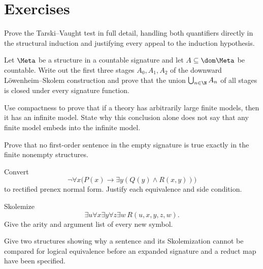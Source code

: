 \section{Exercises}
\label{sec:fol-cardinality-normalforms-06}

\begin{exercise}
\label{ex:fol-cardinality-normalforms-01}
Prove the Tarski--Vaught test in full detail, handling both quantifiers
directly in the structural induction and justifying every appeal to the
induction hypothesis.
\end{exercise}

\begin{exercise}
\label{ex:fol-cardinality-normalforms-02}
Let \(\Meta\) be a structure in a countable signature and let
\(A\subseteq\dom\Meta\) be countable.  Write out the first three stages
\(A_0,A_1,A_2\) of the downward L\"owenheim--Skolem construction and prove
that the union \(\bigcup_{n\in\N}A_n\) of all stages is closed under every
signature function.
\end{exercise}

\begin{exercise}
\label{ex:fol-cardinality-normalforms-03}
Use compactness to prove that if a theory has arbitrarily large finite models,
then it has an infinite model.  State why this conclusion alone does not say
that any finite model embeds into the infinite model.
\end{exercise}

\begin{exercise}
\label{ex:fol-cardinality-normalforms-04}
Prove that no first-order sentence in the empty signature is true exactly in
the finite nonempty structures.
\end{exercise}

\begin{exercise}
\label{ex:fol-cardinality-normalforms-05}
Convert
\[
 \neg\forall x\bigl(P(x)\to\exists y(Q(y)\land R(x,y))\bigr)
\]
to rectified prenex normal form.  Justify each equivalence and side condition.
\end{exercise}

\begin{exercise}
\label{ex:fol-cardinality-normalforms-06}
Skolemize
\[
 \exists u\forall x\exists y\forall z\exists w\,
 R(u,x,y,z,w).
\]
Give the arity and argument list of every new symbol.
\end{exercise}

\begin{exercise}
\label{ex:fol-cardinality-normalforms-07}
Give two structures showing why a sentence and its Skolemization cannot be
compared for logical equivalence before an expanded signature and a reduct map
have been specified.
\end{exercise}

